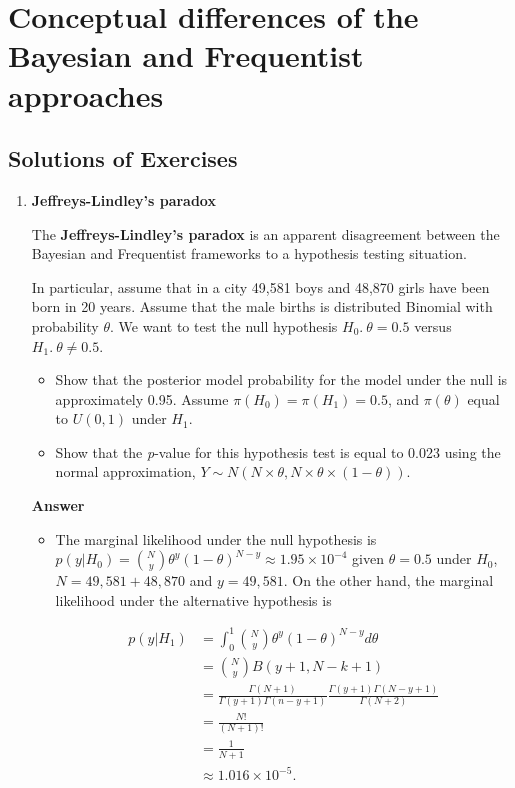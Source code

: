 \chapter{Conceptual differences of the Bayesian and Frequentist approaches}\label{chap2}
\section*{Solutions of Exercises}\label{sec21}
\begin{enumerate}[leftmargin=*]
\item \textbf{Jeffreys-Lindley's paradox}

The \textbf{Jeffreys-Lindley's paradox} \cite{Jeffreys1961,lindley1957statistical} is an apparent disagreement between the Bayesian and Frequentist frameworks to a hypothesis testing situation.

In particular, assume that in a city 49,581 boys and 48,870 girls have been born in 20 years. Assume that the male births is distributed Binomial with probability $\theta$. We want to test the null hypothesis $H_0. \ \theta=0.5$ versus $H_1. \ \theta\neq 0.5$.

\begin{itemize}
	\item Show that the posterior model probability for the model under the null is approximately 0.95. Assume $\pi(H_0)=\pi(H_1)=0.5$, and $\pi(\theta)$ equal to ${U}(0,1)$ under $H_1$.
	\item Show that the \textit{p}-value for this hypothesis test is equal to 0.023 using the normal approximation, $Y\sim {N}(N\times \theta, N\times \theta \times (1-\theta))$. 
\end{itemize}

\textbf{Answer}

\begin{itemize}
	\item The marginal likelihood under the null hypothesis is $p(y|H_0)={N \choose y}\theta^y(1-\theta)^{N-y}\approx 1.95\times 10^{-4}$ given $\theta=0.5$ under $H_0$, $N=49,581+48,870$ and $y=49,581$. On the other hand, the marginal likelihood under the alternative hypothesis is

\begin{align*}
	p(y|H_1)&=\int_{0}^{1}{N \choose y}\theta^y(1-\theta)^{N-y}d\theta\\
	&={N \choose y} B(y+1, N-k+1)\\
	&=\frac{\Gamma(N+1)}{\Gamma(y+1)\Gamma(n-y+1)}\frac{\Gamma(y+1)\Gamma(N-y+1)}{\Gamma(N+2)}\\
	&=\frac{N!}{(N+1)!}\\
	&=\frac{1}{N+1}\\
	&\approx1.016\times 10^{-5}. 
\end{align*}


\end{itemize}
\end{enumerate}
